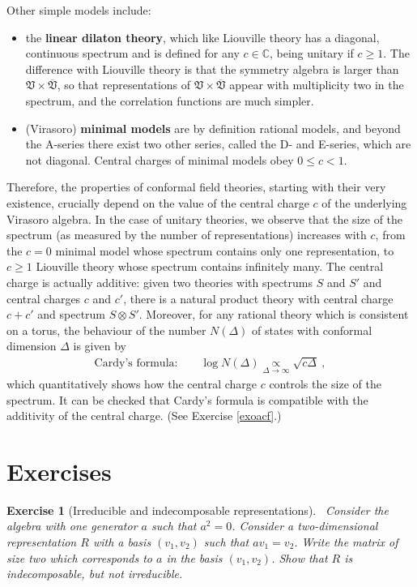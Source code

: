 \documentclass[12pt,a4paper,notitlepage]{report}
\numberwithin{equation}{section}
\theoremstyle{break}
\newtheorem{exo}{Exercise}[chapter]
\begin{document}
Other simple models include:
\begin{itemize}
 \item the \textbf{\boldmath linear dilaton theory}, which like Liouville theory has a diagonal, continuous spectrum and is defined for any $c\in {\mathbb{C}}$, being unitary if $c\geq 1$.
The difference with Liouville theory is that the symmetry algebra is larger than $\mathfrak{V}\times \overline{\mathfrak{V}}$, so that representations of $\mathfrak{V}\times \overline{\mathfrak{V}}$ appear with multiplicity two in the spectrum, and the correlation functions are much simpler.
 \item 
(Virasoro) \textbf{\boldmath minimal models} are by definition rational models, and beyond the A-series there exist two other series, called the 
D- and E-series, which are not diagonal.
Central charges of minimal models obey 
$0\leq c<1$.
\end{itemize}
Therefore,
the properties of conformal field theories, starting with their very existence, crucially depend on the value of the central charge $c$ of the underlying Virasoro algebra.
In the case of unitary theories, we observe that the size of the spectrum (as measured by the number of representations) increases with $c$, from the $c=0$ minimal model whose spectrum contains only one representation, to $c\geq 1$ Liouville theory whose spectrum contains infinitely many.
The central charge is actually additive: given two theories with spectrums $S$ and $S'$ and central charges $c$ and $c'$, there is a natural product theory with central charge $c+c'$ and spectrum $S\otimes S'$.
Moreover, for any rational theory which is consistent on a torus, 
the behaviour of the number $N(\Delta)$ of states with conformal dimension $\Delta$ is given by 
\begin{align}
\text{Cardy's formula:} \qquad \log N(\Delta) \underset{\Delta\rightarrow \infty}{\propto} \sqrt{c \Delta} \ ,
\label{nds}
\end{align}
which quantitatively shows how the central charge $c$ controls the size of the spectrum.
It can be checked that Cardy's formula is compatible with the additivity of the central charge. (See Exercise \ref{exoacf}.)

\section{Exercises}


\begin{exo}[Irreducible and indecomposable representations] 
~\label{exoirr}
Consider the algebra with one generator $a$ such that $a^2 = 0$.
Consider a two-dimensional representation $R$ with a basis $(v_1,v_2)$ such that $av_1=v_2$.
Write the matrix of size two which corresponds to $a$ in the basis $(v_1,v_2)$.
Show that $R$ is indecomposable, but not irreducible. 
\end{exo}
\end{document}
